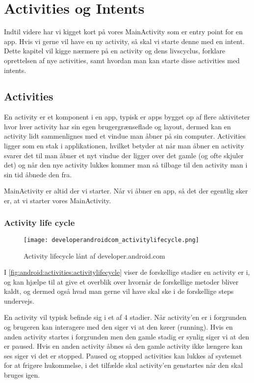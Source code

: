 \chapter{Activities og Intents}
\label{cha:activities-intents}

Indtil videre har vi kigget kort på vores MainActivity som er entry point for en app. Hvis vi gerne vil have en ny activity, så skal vi starte denne med en intent. Dette kapitel vil kigge nærmere på en activity og dens livscyclus, forklare oprettelsen af nye activities, samt hvordan man kan starte disse activities med intents.

\section{Activities}

En activity er et komponent i en app, typisk er apps bygget op af flere aktiviteter hvor hver activity har sin egen brugergrænseflade og layout, dermed kan en activity lidt sammenlignes med et vindue man åbner på sin computer. Activities ligger som en stak i applikationen, hvilket betyder at når man åbner en activity svarer det til man åbner et nyt vindue der ligger over det gamle (og ofte skjuler det) og når den nye activity lukkes kommer man så tilbage til den activity man i sin tid åbnede den fra.

MainActivity er altid der vi starter. Når vi åbner en app, så det der egentlig sker er, at vi starter vores MainActivity.


\subsection{Activity life cycle}

\begin{figure}[h]
	\begin{center}
		\texttt{[image: developerandroidcom\_activitylifecycle.png]}
		\caption{Activity lifecycle lånt af developer.android.com}
		\label{fig:android:activities:activitylifecycle}
	\end{center}
\end{figure}

I \autoref{fig:android:activities:activitylifecycle} viser de forskellige stadier en activity er i, og kan hjælpe til at give et overblik over hvornår de forskellige metoder bliver kaldt, og dermed også hvad man gerne vil have skal ske i de forskellige steps undervejs.

En activity vil typisk befinde sig i et af 4 stadier. Når activity'en er i forgrunden og brugeren kan interagere med den siger vi at den kører (running). Hvis en anden activity startes i forgrunden men den gamle stadig er synlig siger vi at den er paused. Hvis en anden activity åbnes så den gamle activity ikke længere kan ses siger vi det er stopped. Paused og stopped activities kan lukkes af systemet for at frigøre hukommelse, i det tilfælde skal activity'en genstartes når den skal bruges igen.

